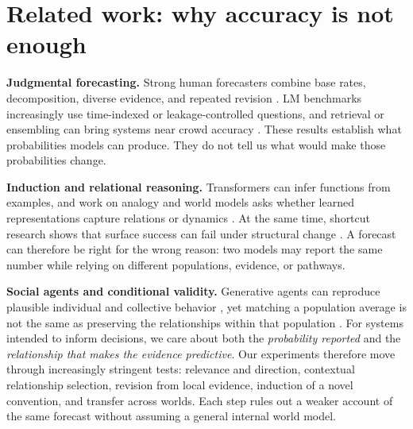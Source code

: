 \section{Related work: why accuracy is not enough}
\label{sec:related-work}

\noindent\textbf{Judgmental forecasting.}
Strong human forecasters combine base rates, decomposition, diverse evidence,
and repeated revision
\citep{tetlock2005expert,mellers2014psychological,tetlock2016superforecasting}.
LM benchmarks increasingly use time-indexed or leakage-controlled questions, and
retrieval or ensembling can bring systems near crowd accuracy
\citep{zou2022forecasting,karger2025forecastbench,halawi2024approaching,schoenegger2024wisdom}.
These results establish what probabilities models can produce. They do not tell
us what would make those probabilities change.

\noindent\textbf{Induction and relational reasoning.}
Transformers can infer functions from examples, and work on analogy and world
models asks whether learned representations capture relations or dynamics
\citep{garg2022what,chan2022data,webb2023emergent,yasunaga2024large,ha2018world,lecun2022path,li2023emergent}.
At the same time, shortcut research shows that surface success can fail under
structural change
\citep{geirhos2020shortcut,mitchell2023ai,vafa2025foundation}. A forecast can
therefore be right for the wrong reason: two models may report the same number
while relying on different populations, evidence, or pathways.

\noindent\textbf{Social agents and conditional validity.}
Generative agents can reproduce plausible individual and collective behavior
\citep{park2023generative,aher2023simulate,argyle2023out}, yet matching a
population average is not the same as preserving the relationships within that
population \citep{bisbee2024synthetic}. For systems intended to inform decisions,
we care about both the \emph{probability reported} and the \emph{relationship
that makes the evidence predictive}. Our experiments therefore move through
increasingly stringent tests: relevance and direction, contextual relationship
selection, revision from local evidence, induction of a novel convention, and
transfer across worlds. Each step rules out a weaker account of the same
forecast without assuming a general internal world model.

